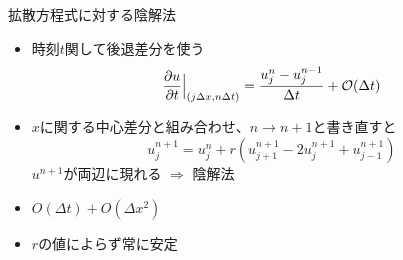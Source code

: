 \begin{frame}[t]{拡散方程式に対する陰解法}
  \begin{itemize}
  \item 時刻$t$関して後退差分を使う
    \[
    \frac{\partial u}{\partial t} \Big|_{(j \Delta x, n \Delta t)} = \frac{u_j^{n} - u_j^{n-1}}{\Delta t} + {\cal O}(\Delta t)
    \]
  \item $x$に関する中心差分と組み合わせ、$n \rightarrow n+1$と書き直すと
    \[
    u_{j}^{n+1} = u_{j}^{n} + r (u_{j+1}^{n+1} - 2 u_{j}^{n+1} + u_{j-1}^{n+1})
    \]
    $u^{n+1}$が両辺に現れる $\Rightarrow$ 陰解法
  \item $O(\Delta t) + O(\Delta x^2)$
  \item $r$の値によらず{\color{red}常に安定}
  \end{itemize}
\end{frame}
